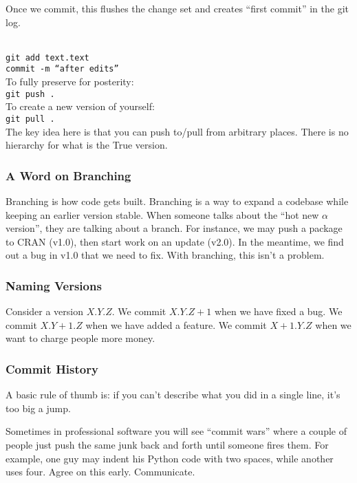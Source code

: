 \documentclass[12pt,letter]{article}
\begin{document}
Once we commit, this flushes the change set and creates ``first
commit'' in the git log.

~\\
\texttt{git add text.text} \\ %
\texttt{commit -m ``after edits''} \\ %

To fully preserve for posterity: %
~\\ \texttt{git push .} \\ %

To create a new version of yourself: %
~\\ \texttt{git pull .} \\ %

The key idea here is that you can push to/pull from arbitrary
places. There is no hierarchy for what is the True version. 

\subsubsection{A Word on Branching}
Branching is how code gets built. Branching is a way to expand a
codebase while keeping an earlier version stable. When someone talks about the ``hot
new $\alpha$ version'', they are talking about a branch. For instance,
we may push a package to CRAN (v1.0), then start work on an update
(v2.0). In the meantime, we find out a bug in v1.0 that we need to
fix. With branching, this isn't a problem. 


\subsubsection{Naming Versions}
Consider a version $X.Y.Z$. We commit $X.Y.Z+1$ when we have fixed a
bug. We commit $X.Y+1.Z$ when we have added a feature. We commit $X+1.Y.Z$
when we want to charge people more money. 

\subsubsection{Commit History}
A basic rule of thumb is: if you can't describe what you did in a
single line, it's too big a jump. 

Sometimes in professional software you will see ``commit wars'' where
a couple of people just push the same junk back and forth until
someone fires them. For example, one guy may indent his Python code
with two spaces, while another uses four. Agree on this
early. Communicate. 
\end{document}
